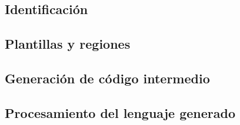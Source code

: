 


\subsection{Identificación}


\subsection{Plantillas y regiones}

\subsection{Generación de código intermedio}

\subsection{Procesamiento del lenguaje generado}

